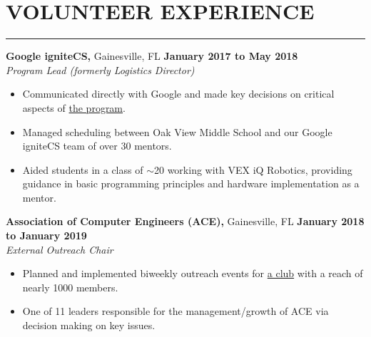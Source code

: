 \section*{VOLUNTEER EXPERIENCE}

\hrule \relax
\sectionheaderspace

\noindent\textbf{Google igniteCS,} Gainesville, FL \hfill\textbf{January 2017 to May 2018}\\
\textit{Program Lead (formerly Logistics Director)}
\begin{itemize}[noitemsep,nolistsep, label = {-}]
	\item Communicated directly with Google and made key decisions on critical aspects of \href{https://sites.google.com/view/ignitecs/home}{the program}.
	\item Managed scheduling between Oak View Middle School and our Google igniteCS team of over 30 mentors.
	\item Aided students in a class of $\sim$20 working with VEX iQ Robotics, providing guidance in basic programming principles and hardware implementation as a mentor.
\end{itemize} 
\subsectionspace

\noindent\textbf{Association of Computer Engineers (ACE),} Gainesville, FL \hfill\textbf{January 2018 to January 2019}\\
\textit{External Outreach Chair}
\begin{itemize}[noitemsep,nolistsep, label={-}]
	\item Planned and implemented biweekly outreach events for \href{https://uf-ace.com/}{a club} with a reach of nearly 1000 members.
	\item One of 11 leaders responsible for the management/growth of ACE via decision making on key issues.
\end{itemize}
\subsectionspace